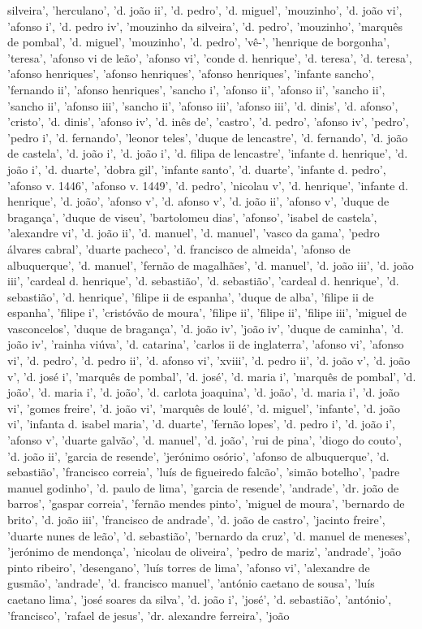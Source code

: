 \documentclass{article}
\begin{document}
\begin{itemize}
silveira', 'herculano', 'd. joão ii', 'd. pedro', 'd. miguel', 'mouzinho', 'd. joão vi', 'afonso i', 'd. pedro iv', 'mouzinho da silveira', 'd. pedro', 'mouzinho', 'marquês de pombal', 'd. miguel', 'mouzinho', 'd. pedro', 'vê-', 'henrique de borgonha', 'teresa', 'afonso vi de leão', 'afonso vi', 'conde d. henrique', 'd. teresa', 'd. teresa', 'afonso henriques', 'afonso henriques', 'afonso henriques', 'infante sancho', 'fernando ii', 'afonso henriques', 'sancho i', 'afonso ii', 'afonso ii', 'sancho ii', 'sancho ii', 'afonso iii', 'sancho ii', 'afonso iii', 'afonso iii', 'd. dinis', 'd. afonso', 'cristo', 'd. dinis', 'afonso iv', 'd. inês de', 'castro', 'd. pedro', 'afonso iv', 'pedro', 'pedro i', 'd. fernando', 'leonor teles', 'duque de lencastre', 'd. fernando', 'd. joão de castela', 'd. joão i', 'd. joão i', 'd. filipa de lencastre', 'infante d. henrique', 'd. joão i', 'd. duarte', 'dobra gil', 'infante santo', 'd. duarte', 'infante d. pedro', 'afonso v. 1446', 'afonso v. 1449', 'd. pedro', 'nicolau v', 'd. henrique', 'infante d. henrique', 'd. joão', 'afonso v', 'd. afonso v', 'd. joão ii', 'afonso v', 'duque de bragança', 'duque de viseu', 'bartolomeu dias', 'afonso', 'isabel de castela', 'alexandre vi', 'd. joão ii', 'd. manuel', 'd. manuel', 'vasco da gama', 'pedro álvares cabral', 'duarte pacheco', 'd. francisco de almeida', 'afonso de albuquerque', 'd. manuel', 'fernão de magalhães', 'd. manuel', 'd. joão iii', 'd. joão iii', 'cardeal d. henrique', 'd. sebastião', 'd. sebastião', 'cardeal d. henrique', 'd. sebastião', 'd. henrique', 'filipe ii de espanha', 'duque de alba', 'filipe ii de espanha', 'filipe i', 'cristóvão de moura', 'filipe ii', 'filipe ii', 'filipe iii', 'miguel de vasconcelos', 'duque de bragança', 'd. joão iv', 'joão iv', 'duque de caminha', 'd. joão iv', 'rainha viúva', 'd. catarina', 'carlos ii de inglaterra', 'afonso vi', 'afonso vi', 'd. pedro', 'd. pedro ii', 'd. afonso vi', 'xviii', 'd. pedro ii', 'd. joão v', 'd. joão v', 'd. josé i', 'marquês de pombal', 'd. josé', 'd. maria i', 'marquês de pombal', 'd. joão', 'd. maria i', 'd. joão', 'd. carlota joaquina', 'd. joão', 'd. maria i', 'd. joão vi', 'gomes freire', 'd. joão vi', 'marquês de loulé', 'd. miguel', 'infante', 'd. joão vi', 'infanta d. isabel maria', 'd. duarte', 'fernão lopes', 'd. pedro i', 'd. joão i', 'afonso v', 'duarte galvão', 'd. manuel', 'd. joão', 'rui de pina', 'diogo do couto', 'd. joão ii', 'garcia de resende', 'jerónimo osório', 'afonso de albuquerque', 'd. sebastião', 'francisco correia', 'luís de figueiredo falcão', 'simão botelho', 'padre manuel godinho', 'd. paulo de lima', 'garcia de resende', 'andrade', 'dr. joão de barros', 'gaspar correia', 'fernão mendes pinto', 'miguel de moura', 'bernardo de brito', 'd. joão iii', 'francisco de andrade', 'd. joão de castro', 'jacinto freire', 'duarte nunes de leão', 'd. sebastião', 'bernardo da cruz', 'd. manuel de meneses', 'jerónimo de mendonça', 'nicolau de oliveira', 'pedro de mariz', 'andrade', 'joão pinto ribeiro', 'desengano', 'luís torres de lima', 'afonso vi', 'alexandre de gusmão', 'andrade', 'd. francisco manuel', 'antónio caetano de sousa', 'luís caetano lima', 'josé soares da silva', 'd. joão i', 'josé', 'd. sebastião', 'antónio', 'francisco', 'rafael de jesus', 'dr. alexandre ferreira', 'joão 
\end{itemize}
\end{document}
